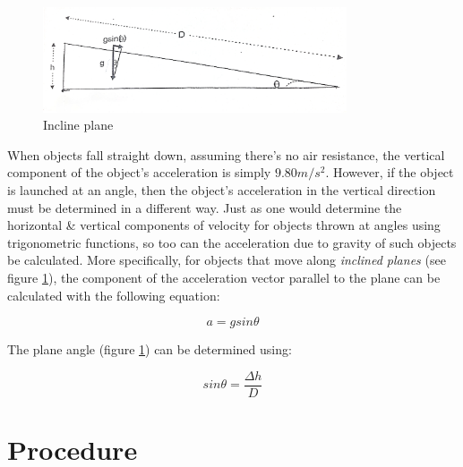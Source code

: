 \documentclass[a4paper,12pt]{article}
\begin{document}
\begin{figure}[h!]
    \centering
    \includegraphics[width=0.8\textwidth]{figure1_inclineplane} %
    \caption{Incline plane}
    \label{fig:inclineplane}
\end{figure}

When objects fall straight down, assuming there's no air resistance, the vertical component of the object's acceleration is simply $9.80 {m/s^2}$. However, if the object is launched at an angle, then the object's acceleration in the vertical direction must be determined in a different way. Just as one would determine the horizontal \& vertical components of velocity for objects thrown at angles using trigonometric functions, so too can the acceleration due to gravity of such objects be calculated. More specifically, for objects that move along \textit{inclined planes} (see figure \ref{fig:inclineplane}), the component of the acceleration vector parallel to the plane can be calculated with the following equation:

\begin{equation}
a = gsin\theta
\label{eq:1}
\end{equation}

The plane angle (figure \ref{fig:inclineplane}) can be determined using:

\begin{equation}	
sin\theta = \frac{\Delta{h}}{D}
\label{eq:2}
\end{equation}

\newpage






\section{Procedure}
\vspace{-0.5cm}
\singlespacing


\end{document}
